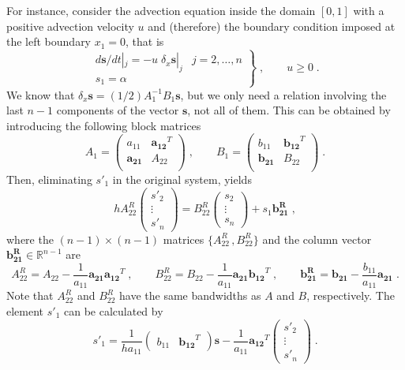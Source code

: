 {For instance, consider the advection equation inside the domain $[0,1]$ with a
positive advection velocity $u$ and (therefore) the boundary condition imposed
at the left boundary $x_1=0$, that is
\begin{equation}
  \left.\begin{array}{ll}
      d\mathbf{s}/dt|_j = -u\; \delta_x \mathbf{s}|_j & j=2,\ldots,n\\
      s_1=\alpha
    \end{array}\right\} \;,\qquad u\ge 0  \;.
\label{equ:problem2}
\end{equation}
We know that $\delta_x \mathbf{s} = (1/2)A_1^{-1}B_1\mathbf{s}$, but we only
need a relation involving the last $n-1$ components of the vector $\mathbf{s}$,
not all of them. This can be obtained by introducing the following block
matrices \citep{Lomax:1998,Mellado:2012}
\begin{equation*}
A_1=
\left(\begin{array}{cc}a_{11}&\mathbf{a_{12}}^T \\\mathbf{a_{21}}   &A_{22}\\
\end{array}\right) \;, \qquad
B_1=
\left(\begin{array}{cc}b_{11}&\mathbf{b_{12}}^T \\\mathbf{b_{21}}   &B_{22}\\
\end{array}\right) \;.
\end{equation*}
Then, eliminating $s'_1$ in the original system, yields
\begin{equation}
hA^R_{22}
\left(\begin{array}{c}s'_2\\\vdots\\s'_n\end{array}\right) =
B^R_{22}\left(\begin{array}{c}s_2\\\vdots\\s_n\end{array}\right)+
s_1\mathbf{b^R_{21}} \;,
\end{equation}
where the $(n-1)\times (n-1)$ matrices $\{A^R_{22}\,,B^R_{22}\}$ and the column
vector $\mathbf{b^R_{21}}\in\mathbb{R}^{n-1}$ are
\begin{equation}
A^R_{22}=A_{22}-\frac{1}{a_{11}}\mathbf{a_{21}}\mathbf{a_{12}}^T \;,\qquad
B^R_{22}=B_{22}-\frac{1}{a_{11}}\mathbf{a_{21}}\mathbf{b_{12}}^T \;,\qquad
\mathbf{b^R_{21}}=\mathbf{b_{21}}-\frac{b_{11}}{a_{11}}\mathbf{a_{21}} \;.
\end{equation}
Note that $A^R_{22}$ and $B^R_{22}$ have the same bandwidths as $A$ and $B$,
respectively. The element $s'_1$ can be calculated by
\begin{equation}
s'_1=\frac{1}{ha_{11}}
\left(\begin{array}{cc}b_{11}\!&\!\mathbf{b_{12}}^T\end{array}\right)
\mathbf{s} - \frac{1}{a_{11}}
\mathbf{a_{12}}^T \left(\begin{array}{c}s'_2\\\vdots\\s'_n\end{array}\right)\;.
\end{equation}


}
